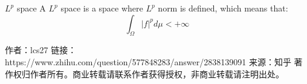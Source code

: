 \documentclass{article}
\begin{document}
\begin{theorem}{$L^p$ space}
    A $L^p$ space is a space where $L^p$ norm is defined, which means that:
\begin{equation}
    \int_\Omega |f|^p d\mu<+\infty
\end{equation}
\end{theorem}

作者：lcs27
链接：https://www.zhihu.com/question/577848283/answer/2838139091
来源：知乎
著作权归作者所有。商业转载请联系作者获得授权，非商业转载请注明出处。
\end{document}
